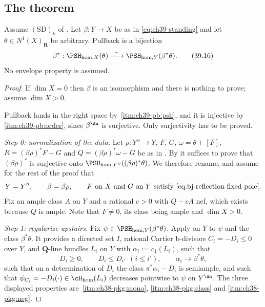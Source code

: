 \subsection{The theorem}
\label{sec:ch39-homogeneous-theorem}

\begin{theorem}
\label{thm:bj-homogeneous-reflection}
Assume $\mathrm{(SD)}_k$ of .
Let $\beta:Y\to X$ be as in \eqref{eq:ch39-standing} and let
$\theta\in N^1(X)_{\mathbf R}$ be arbitrary.  Pullback is a bijection
\[
 \beta^*:\PSH_{\mathrm{hom},X}(\theta)
       \xrightarrow{\ \sim\ }
       \PSH_{\mathrm{hom},Y}(\beta^*\theta).
\tag{39.16}\label{eq:bj-homogeneous-reflection}
\]
No envelope property is assumed.
\end{theorem}

\begin{proof}
If $\dim X=0$ then $\beta$ is an isomorphism and there is nothing to
prove; assume $\dim X>0$.

Pullback lands in the right space by
\,\cref{itm:ch39-pb:psh}, and it is injective by
\,\cref{itm:ch39-pb:order}, since $\beta^{\An}$ is
surjective.  Only surjectivity has to be proved.

\medskip
\noindent\emph{Step 0: normalization of the data.}
Let $\rho:Y''\to Y$, $F$, $G$, $\omega=\theta+[F]$,
$R=(\beta\rho)^*F-G$ and $Q=(\beta\rho)^*\omega-G$ be as in
.  By  it
suffices to prove that $(\beta\rho)^*$ is surjective onto
$\PSH_{\mathrm{hom},Y''}((\beta\rho)^*\theta)$.  We therefore rename, and
assume for the rest of the proof that
\[
 Y=Y'',\qquad \beta=\beta\rho,\qquad
 \text{$F$ on $X$ and $G$ on $Y$ satisfy
 \eqref{eq:bj-reflection-fixed-pole}.}
\]
Fix an ample class $A$ on $Y$ and a rational $c>0$ with $Q-cA$ nef,
which exists because $Q$ is ample.  Note that $F\ne0$, its class being
ample and $\dim X>0$.

\medskip
\noindent\emph{Step 1: regularize upstairs.}
Fix $\psi\in\PSH_{\mathrm{hom},Y}(\beta^*\theta)$.  Apply
 on $Y$ to $\psi$ and the
class $\beta^*\theta$.  It provides a directed set $I$, rational Cartier
b-divisors $C_i=-D_i\le0$ over $Y$, and $\mathbf Q$-line bundles
$L_i$ on $Y$ with $\alpha_i:=c_1(L_i)$, such that
\[
 D_i\ge0,\qquad
 D_i\le D_{i'}\ \ (i\le i'),\qquad
 \alpha_i\longrightarrow\beta^*\theta,
\tag{39.17}\label{eq:bj-homogeneous-regularization-data}
\]
such that on a determination of $D_i$ the class $\pi^*\alpha_i-D_i$ is
semiample, and such that
$\psi_{C_i}=-D_i(\cdot)\in\cH_{\mathrm{hom}}(L_i)$ decreases pointwise to
$\psi$ on $Y^{\An}$.  The three displayed properties are
\,\cref{itm:ch38-pkg:mono},
\cref{itm:ch38-pkg:class} and \cref{itm:ch38-pkg:neg}.


\end{proof}
